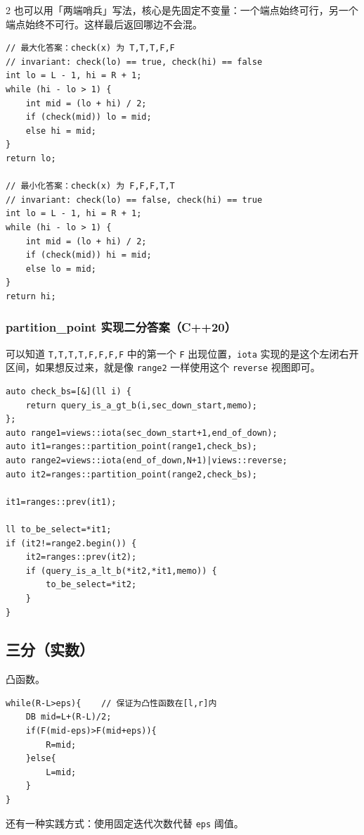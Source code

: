 \begin{multicols*}{2}
		也可以用「两端哨兵」写法，核心是先固定不变量：一个端点始终可行，另一个端点始终不可行。这样最后返回哪边不会混。

		\begin{verbatim}
// 最大化答案：check(x) 为 T,T,T,F,F
// invariant: check(lo) == true, check(hi) == false
int lo = L - 1, hi = R + 1;
while (hi - lo > 1) {
    int mid = (lo + hi) / 2;
    if (check(mid)) lo = mid;
    else hi = mid;
}
return lo;

// 最小化答案：check(x) 为 F,F,F,T,T
// invariant: check(lo) == false, check(hi) == true
int lo = L - 1, hi = R + 1;
while (hi - lo > 1) {
    int mid = (lo + hi) / 2;
    if (check(mid)) hi = mid;
    else lo = mid;
}
return hi;
		\end{verbatim}

		\subsubsection{partition\_point 实现二分答案（C++20）}

		可以知道 \texttt{T,T,T,T,F,F,F,F} 中的第一个 \texttt{F} 出现位置，\texttt{iota} 实现的是这个左闭右开区间，如果想反过来，就是像 \texttt{range2} 一样使用这个 \texttt{reverse} 视图即可。

		\begin{verbatim}
auto check_bs=[&](ll i) {
    return query_is_a_gt_b(i,sec_down_start,memo);
};
auto range1=views::iota(sec_down_start+1,end_of_down);
auto it1=ranges::partition_point(range1,check_bs);
auto range2=views::iota(end_of_down,N+1)|views::reverse;
auto it2=ranges::partition_point(range2,check_bs);

it1=ranges::prev(it1);

ll to_be_select=*it1;
if (it2!=range2.begin()) {
    it2=ranges::prev(it2);
    if (query_is_a_lt_b(*it2,*it1,memo)) {
        to_be_select=*it2;
    }
}
		\end{verbatim}

		\subsection{三分（实数）}

		凸函数。

		\begin{verbatim}
while(R-L>eps){    // 保证为凸性函数在[l,r]内
    DB mid=L+(R-L)/2;
    if(F(mid-eps)>F(mid+eps)){
        R=mid;
    }else{
        L=mid;
    }
}
		\end{verbatim}

		还有一种实践方式：使用固定迭代次数代替 \texttt{eps} 阈值。


\end{multicols*}
